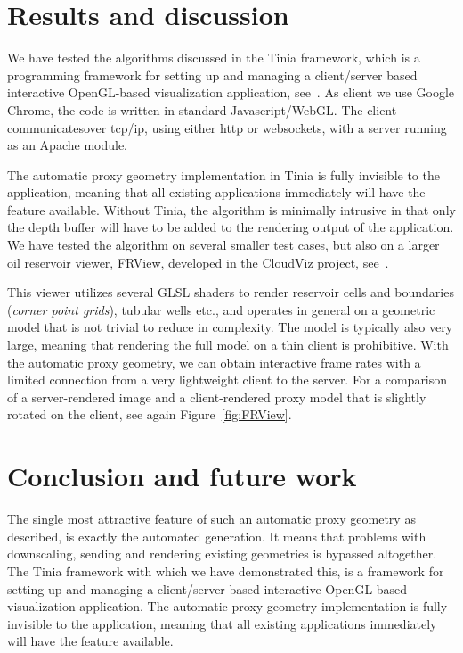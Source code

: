 \section{Results and discussion}

We have tested the algorithms discussed in the Tinia framework, which is a
programming framework for setting up and managing a client/server based
interactive OpenGL-based visualization application, see~\cite{tinia}. As client
we use Google Chrome, the code is written in standard Javascript/WebGL.
The client communicatesover tcp/ip, using either http or
websockets, with a server running as an Apache module.

The automatic proxy geometry implementation in Tinia is fully invisible to the
application, meaning that all existing applications immediately will have the
feature available. Without Tinia, the algorithm is minimally intrusive in that
only the depth buffer will have to be added to the rendering output of the
application. We have tested the algorithm on several smaller test cases, but
also on a larger oil reservoir viewer, FRView, developed in the CloudViz
project, see~\cite{cloudviz}.

This viewer utilizes several GLSL shaders to render reservoir cells and
boundaries ({\em corner point grids}), tubular wells etc., and operates in
general on a geometric model that is not trivial to reduce in complexity. The
model is typically also very large, meaning that rendering the full model on a
thin client is prohibitive. With the automatic proxy geometry, we can obtain
interactive frame rates with a limited connection from a very lightweight client
to the server. For a comparison of a server-rendered image and a client-rendered
proxy model that is slightly rotated on the client, see again Figure~\ref{fig:FRView}.


\section{Conclusion and future work}

The single most attractive feature of such an automatic proxy geometry as
described, is exactly the automated generation. It means that problems with
downscaling, sending and rendering existing geometries is bypassed
altogether. The Tinia framework with which we have demonstrated this, is a
framework for setting up and managing a client/server based interactive OpenGL
based visualization application. The automatic proxy geometry implementation is
fully invisible to the application, meaning that all existing applications
immediately will have the feature available.

